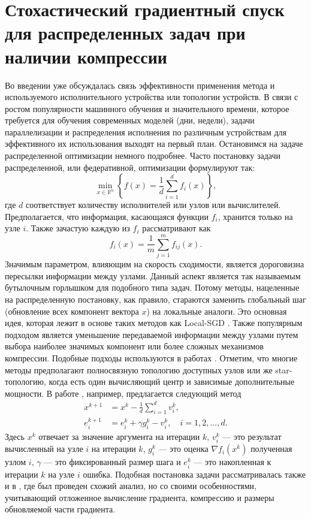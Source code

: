 \section{Стохастический градиентный спуск для распределенных задач при наличии компрессии} \label{raspr}
  Во введении уже обсуждалась связь эффективности применения метода и используемого исполнительного устройства или топологии устройств. В связи с ростом популярности машинного обучения и значительного времени, которое требуется для обучения современных моделей (дни, недели), задачи параллелизации и распределения исполнения по различным устройствам для эффективного их использования выходят на первый план. Остановимся на задаче распределенной оптимизации немного подробнее. Часто постановку задачи распределенной, или федеративной, оптимизации формулируют так:
  \begin{equation} \label{raspr_task}
    \min_{x \in \mathbb{R}^n}\left\{f(x)=\frac{1}{d} \sum_{i=1}^d f_i(x)\right\},
  \end{equation}
  где $d$ соответствует количеству исполнителей или узлов или вычислителей. Предполагается, что информация, касающаяся функции $f_i$, хранится только на узле $i$. Также зачастую каждую из $f_i$ рассматривают как
  $$
    f_i(x) = \frac{1}{m} \sum_{j=1}^m f_{ij}(x).
  $$ 
  Значимым параметром, влияющим на скорость сходимости, является дороговизна пересылки информации между узлами. Данный аспект является так называемым бутылочным горлышком для подобного типа задач. Потому методы, нацеленные на распределенную постановку, как правило, стараются заменить глобальный шаг (обновление всех компонент вектора $x$) на локальные аналоги. Это основная идея, которая лежит в основе таких методов как Local-SGD \cite{Stich2019LocalSC}. Также популярным подходом является уменьшение передаваемой информации между узлами путем выбора наиболее значимых компонент или более сложных механизмов компрессии. Подобные подходы используются в работах \cite{qlsgd, qsgd, err_fdbk}. Отметим, что многие методы предполагают полносвязную топологию доступных узлов или же star-топологию, когда есть один вычисляющий центр и зависимые дополнительные мощности. 
  В работе \cite{GorbunovKMR20}, например, предлагается следующий метод
  $$
  \begin{aligned} 
    x^{k+1} &=x^k-\frac{1}{d} \sum_{i=1}^d v_i^k, \\ 
    e_i^{k+1} &=e_i^k + \gamma g_i^k - v_i^k, \quad i=1,2, \ldots, d . 
  \end{aligned}
  $$
  Здесь $x^k$ отвечает за значение аргумента на итерации $k$, $v_i^k$ --- это результат вычисленный на узле $i$ на итерации $k$, $g_i^k$ --- это оценка $\nabla f_i(x^k)$ полученная узлом $i$, $\gamma$ --- это фиксированный размер шага и $e_i^k$ --- это накопленная к итерации $k$ на узле $i$ ошибка.  Подобная постановка задачи рассматривалась также и в \cite{err_fdbk}, где был проведен схожий анализ, но со своими особенностями, учитывающий отложенное вычисление градиента, компрессию и размеры обновляемой части градиента.
